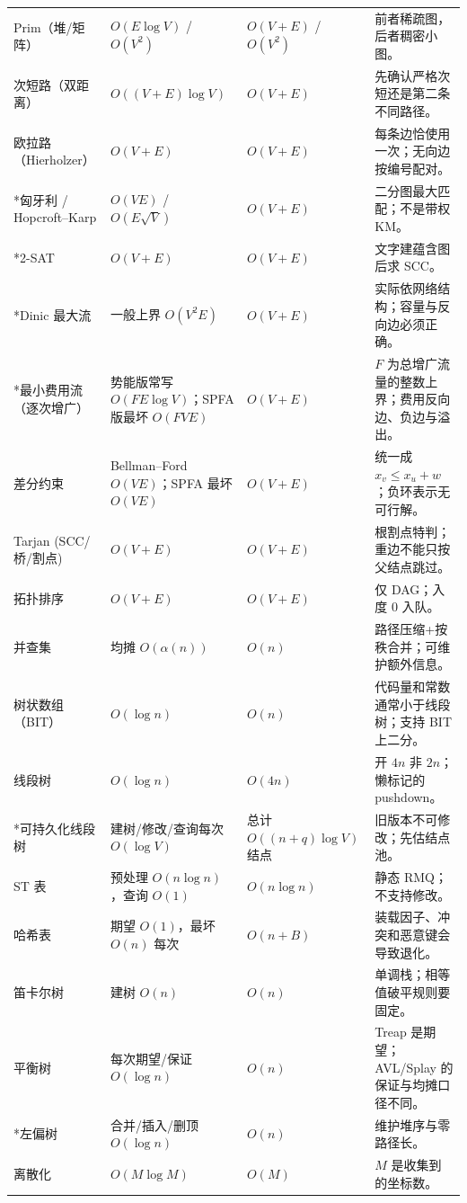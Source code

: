 \documentclass[a4paper,11pt]{article}
\begin{document}
\begin{longtable}{L{3cm} L{2.8cm} L{2.4cm} L{8cm}}
Prim（堆/矩阵） & $O(E\log V)$ / $O(V^2)$ & $O(V+E)$ / $O(V^2)$ & 前者稀疏图，后者稠密小图。\\[2mm]
次短路（双距离） & $O((V+E)\log V)$ & $O(V+E)$ & 先确认严格次短还是第二条不同路径。\\[2mm]
欧拉路（Hierholzer） & $O(V+E)$ & $O(V+E)$ & 每条边恰使用一次；无向边按编号配对。\\[2mm]
*匈牙利 / Hopcroft--Karp & $O(VE)$ / $O(E\sqrt V)$ & $O(V+E)$ & 二分图最大匹配；不是带权 KM。\\[2mm]
*2-SAT & $O(V+E)$ & $O(V+E)$ & 文字建蕴含图后求 SCC。\\[2mm]
*Dinic 最大流 & 一般上界 $O(V^2E)$ & $O(V+E)$ & 实际依网络结构；容量与反向边必须正确。\\[2mm]
*最小费用流（逐次增广） & 势能版常写 $O(FE\log V)$；SPFA 版最坏 $O(FVE)$ & $O(V+E)$ & $F$ 为总增广流量的整数上界；费用反向边、负边与溢出。\\[2mm]
差分约束 & Bellman--Ford $O(VE)$；SPFA 最坏 $O(VE)$ & $O(V+E)$ & 统一成 $x_v\le x_u+w$；负环表示无可行解。\\[2mm]
Tarjan (SCC/桥/割点) & $O(V+E)$ & $O(V+E)$ & 根割点特判；重边不能只按父结点跳过。\\[2mm]
拓扑排序 & $O(V+E)$ & $O(V+E)$ & 仅 DAG；入度 0 入队。\\[2mm]
并查集 & 均摊 $O(\alpha(n))$ & $O(n)$ & 路径压缩+按秩合并；可维护额外信息。\\[2mm]
树状数组（BIT） & $O(\log n)$ & $O(n)$ & 代码量和常数通常小于线段树；支持 BIT 上二分。\\[2mm]
线段树 & $O(\log n)$ & $O(4n)$ & 开 $4n$ 非 $2n$；懒标记的 pushdown。\\[2mm]
*可持久化线段树 & 建树/修改/查询每次 $O(\log V)$ & 总计 $O((n+q)\log V)$ 结点 & 旧版本不可修改；先估结点池。\\[2mm]
ST 表 & 预处理 $O(n\log n)$，查询 $O(1)$ & $O(n\log n)$ & 静态 RMQ；不支持修改。\\[2mm]
哈希表 & 期望 $O(1)$，最坏 $O(n)$ 每次 & $O(n+B)$ & 装载因子、冲突和恶意键会导致退化。\\[2mm]
笛卡尔树 & 建树 $O(n)$ & $O(n)$ & 单调栈；相等值破平规则要固定。\\[2mm]
平衡树 & 每次期望/保证 $O(\log n)$ & $O(n)$ & Treap 是期望；AVL/Splay 的保证与均摊口径不同。\\[2mm]
*左偏树 & 合并/插入/删顶 $O(\log n)$ & $O(n)$ & 维护堆序与零路径长。\\[2mm]
离散化 & $O(M\log M)$ & $O(M)$ & $M$ 是收集到的坐标数。\\[2mm]

\end{longtable}
\end{document}
